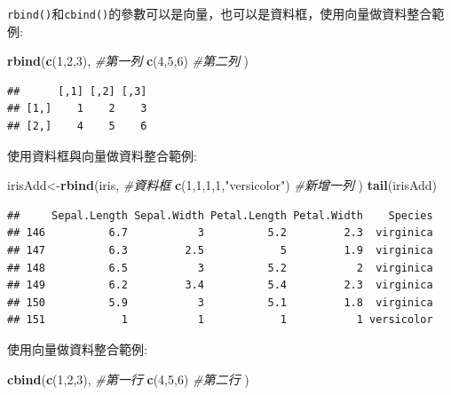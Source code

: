 \documentclass[]{book}
\newenvironment{Shaded}{\begin{snugshade}}{\end{snugshade}}
\newcommand{\KeywordTok}[1]{\textcolor[rgb]{0.13,0.29,0.53}{\textbf{{#1}}}}
\newcommand{\DecValTok}[1]{\textcolor[rgb]{0.00,0.00,0.81}{{#1}}}
\newcommand{\StringTok}[1]{\textcolor[rgb]{0.31,0.60,0.02}{{#1}}}
\newcommand{\CommentTok}[1]{\textcolor[rgb]{0.56,0.35,0.01}{\textit{{#1}}}}
\newcommand{\NormalTok}[1]{{#1}}
\theoremstyle{definition}
\theoremstyle{definition}
\theoremstyle{remark}
\begin{document}
\texttt{rbind()}和\texttt{cbind()}的參數可以是向量，也可以是資料框，使用向量做資料整合範例:

\begin{Shaded}
\begin{Highlighting}[]
\KeywordTok{rbind}\NormalTok{(}\KeywordTok{c}\NormalTok{(}\DecValTok{1}\NormalTok{,}\DecValTok{2}\NormalTok{,}\DecValTok{3}\NormalTok{), }\CommentTok{#第一列}
      \KeywordTok{c}\NormalTok{(}\DecValTok{4}\NormalTok{,}\DecValTok{5}\NormalTok{,}\DecValTok{6}\NormalTok{)  }\CommentTok{#第二列}
      \NormalTok{) }
\end{Highlighting}
\end{Shaded}

\begin{verbatim}
##      [,1] [,2] [,3]
## [1,]    1    2    3
## [2,]    4    5    6
\end{verbatim}

使用資料框與向量做資料整合範例:

\begin{Shaded}
\begin{Highlighting}[]
\NormalTok{irisAdd<-}\KeywordTok{rbind}\NormalTok{(iris, }\CommentTok{#資料框}
      \KeywordTok{c}\NormalTok{(}\DecValTok{1}\NormalTok{,}\DecValTok{1}\NormalTok{,}\DecValTok{1}\NormalTok{,}\DecValTok{1}\NormalTok{,}\StringTok{"versicolor"}\NormalTok{)  }\CommentTok{#新增一列}
      \NormalTok{) }
\KeywordTok{tail}\NormalTok{(irisAdd)}
\end{Highlighting}
\end{Shaded}

\begin{verbatim}
##     Sepal.Length Sepal.Width Petal.Length Petal.Width    Species
## 146          6.7           3          5.2         2.3  virginica
## 147          6.3         2.5            5         1.9  virginica
## 148          6.5           3          5.2           2  virginica
## 149          6.2         3.4          5.4         2.3  virginica
## 150          5.9           3          5.1         1.8  virginica
## 151            1           1            1           1 versicolor
\end{verbatim}

使用向量做資料整合範例:

\begin{Shaded}
\begin{Highlighting}[]
\KeywordTok{cbind}\NormalTok{(}\KeywordTok{c}\NormalTok{(}\DecValTok{1}\NormalTok{,}\DecValTok{2}\NormalTok{,}\DecValTok{3}\NormalTok{), }\CommentTok{#第一行}
      \KeywordTok{c}\NormalTok{(}\DecValTok{4}\NormalTok{,}\DecValTok{5}\NormalTok{,}\DecValTok{6}\NormalTok{)  }\CommentTok{#第二行}
      \NormalTok{) }
\end{Highlighting}
\end{Shaded}
\end{document}
